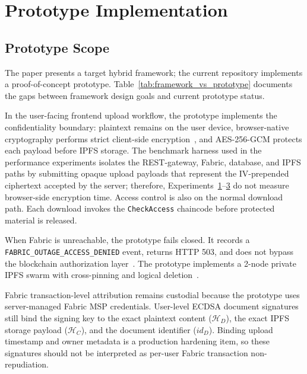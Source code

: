 \documentclass{ieeeaccess}
\begin{document}
\section{Prototype Implementation}
\label{sec:prototype_implementation}

\subsection{Prototype Scope}
\label{sec:prototype_scope}

The paper presents a target hybrid framework; the current repository
implements a proof-of-concept prototype. Table~\ref{tab:framework_vs_prototype}
documents the gaps between framework design goals and current prototype
status.

In the user-facing frontend upload workflow, the prototype implements the
confidentiality boundary: plaintext remains on the user device, browser-native
cryptography performs strict client-side encryption~\cite{fips197,w3cWebCrypto},
and AES-256-GCM protects each payload before IPFS storage. The benchmark
harness used in the performance experiments isolates the REST-gateway,
Fabric, database, and IPFS paths by submitting opaque upload payloads that
represent the IV-prepended ciphertext accepted by the server; therefore,
Experiments~\hyperref[sec:exp_scalability]{1}--\hyperref[sec:exp_filesize]{3}
do not measure browser-side encryption time. Access control is also on the
normal download path. Each download invokes the \texttt{CheckAccess}
chaincode before protected material is released.

When Fabric is unreachable, the prototype fails closed. It records a
\texttt{FABRIC\_OUTAGE\_ACCESS\_DENIED} event, returns HTTP 503, and does
not bypass the blockchain authorization layer~\cite{RBACSandhu}. The
prototype implements a 2-node private IPFS swarm with cross-pinning and
logical deletion~\cite{politou2019metadata,finck2019blockchain}.

Fabric transaction-level attribution remains custodial because the
prototype uses server-managed Fabric MSP credentials. User-level ECDSA
document signatures still bind the signing key to the exact plaintext
content ($\mathcal{H}_D$), the exact IPFS storage payload
($\mathcal{H}_C$), and the document identifier ($id_D$). Binding upload
timestamp and owner metadata is a production hardening item, so these
signatures should not be interpreted as per-user Fabric transaction
non-repudiation.
\end{document}
